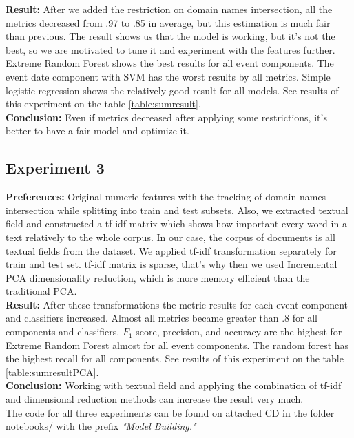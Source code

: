 \noindent\textbf{Result:} After we added the restriction on domain names intersection, all the metrics decreased from .97 to .85 in average, but this estimation is much fair than previous. The result shows us that the model is working, but it's not the best, so we are motivated to tune it and experiment with the features further. Extreme Random Forest shows the best results for all event components. The event date component with SVM has the worst results by all metrics. Simple logistic regression shows the relatively good result for all models. See results of this experiment on the table \ref{table:sumresult}.\\     

\noindent\textbf{Conclusion:} Even if metrics decreased after applying some restrictions, it's better to have a fair model and optimize it.


\subsection{Experiment 3}
\noindent\textbf{Preferences:} Original numeric features with the tracking of domain names intersection while splitting into train and test subsets. Also, we extracted textual field and constructed a tf-idf \cite{tfidf} matrix which shows how important every word in a text relatively to the whole corpus. In our case, the corpus of documents is all textual fields from the dataset. We applied tf-idf transformation separately for train and test set. tf-idf matrix is sparse, that's why then we used Incremental PCA \cite{PCA} dimensionality reduction, which is more memory efficient than the traditional PCA. \\

\noindent\textbf{Result:} After these transformations the metric results for each event component and classifiers increased. Almost all metrics became greater than .8 for all components and classifiers. $F_1$ score, precision, and accuracy are the highest for Extreme Random Forest almost for all event components. The random forest has the highest recall for all components. See results of this experiment on the table \ref{table:sumresultPCA}.\\

\noindent\textbf{Conclusion:} Working with textual field and applying the combination of tf-idf and dimensional reduction methods can increase the result very much.\\

The code for all three experiments can be found on attached CD in the folder notebooks/ with the prefix \textit{"Model Building."}

